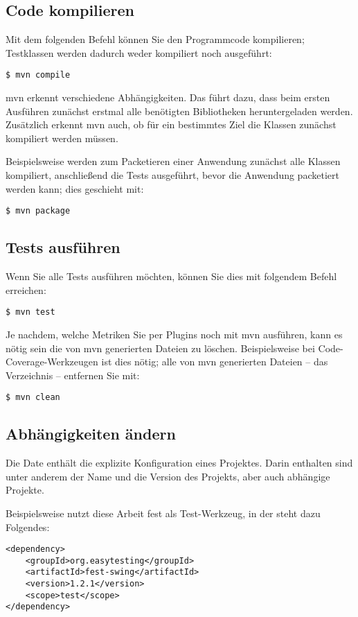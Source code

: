 \subsection{Code kompilieren}
Mit dem folgenden Befehl können Sie den Programmcode kompilieren; Testklassen werden dadurch weder kompiliert noch ausgeführt:
\begin{verbatim}
$ mvn compile
\end{verbatim}

\gls{mvn} erkennt verschiedene Abhängigkeiten. Das führt dazu, dass beim ersten Ausführen zunächst erstmal alle benötigten Bibliotheken heruntergeladen werden. Zusätzlich erkennt \gls{mvn} auch, ob für ein bestimmtes Ziel die Klassen zunächst kompiliert werden müssen.

Beispielsweise werden zum Packetieren einer Anwendung zunächst alle Klassen kompiliert, anschließend die Tests ausgeführt, bevor die Anwendung packetiert werden kann; dies geschieht mit:
\begin{verbatim}
$ mvn package
\end{verbatim}

\subsection{Tests ausführen}
Wenn Sie alle Tests ausführen möchten, können Sie dies mit folgendem Befehl erreichen:
\begin{verbatim}
$ mvn test
\end{verbatim}

Je nachdem, welche Metriken Sie per Plugins noch mit \gls{mvn} ausführen, kann es nötig sein die von \gls{mvn} generierten Dateien zu löschen. Beispielsweise bei Code-Coverage-Werkzeugen ist dies nötig; alle von \gls{mvn} generierten Dateien -- das Verzeichnis  -- entfernen Sie mit:
\begin{verbatim}
$ mvn clean
\end{verbatim}

\subsection{Abhängigkeiten ändern}
Die Date  enthält die explizite Konfiguration eines Projektes. Darin enthalten sind unter anderem der Name und die Version des Projekts, aber auch abhängige Projekte.

Beispielsweise nutzt diese Arbeit \gls{fest} als Test-Werkzeug, in der  steht dazu Folgendes:
\begin{verbatim}
<dependency>
    <groupId>org.easytesting</groupId>
    <artifactId>fest-swing</artifactId>
    <version>1.2.1</version>
    <scope>test</scope>
</dependency>
\end{verbatim}

